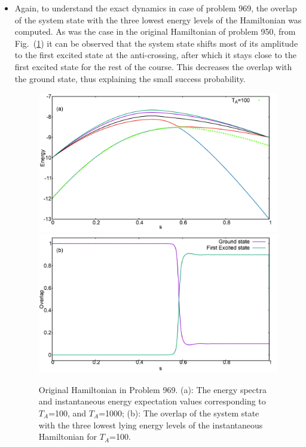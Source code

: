 \documentclass[../main.tex]{subfiles}
\begin{document}
\begin{itemize}
\item Again, to understand the exact dynamics in case of problem 969, the overlap of the system state with the three lowest energy levels of the Hamiltonian was computed. As was the case in the original Hamiltonian of problem 950, from Fig.~(\ref{fig:a47}) it can be observed that the system state shifts most of its amplitude to the first excited state at the anti-crossing, after which it stays close to the first excited state for the rest of the course. This decreases the overlap with the ground state, thus explaining the small success probability.
\begin{figure}
\centering
  \includegraphics[scale=0.24]{969_O_T100.png}
  \includegraphics[scale=0.24]{969_Overlap_Orig.png}
  \caption{Original Hamiltonian in Problem 969. (a): The energy spectra and instantaneous energy expectation values corresponding to $T_A$=100, and $T_A$=1000; (b): The overlap of the system state with the three lowest lying energy levels of the instantaneous Hamiltonian for $T_A$=100.}
    \label{fig:a47}
 \end{figure}


\end{itemize}
\end{document}
